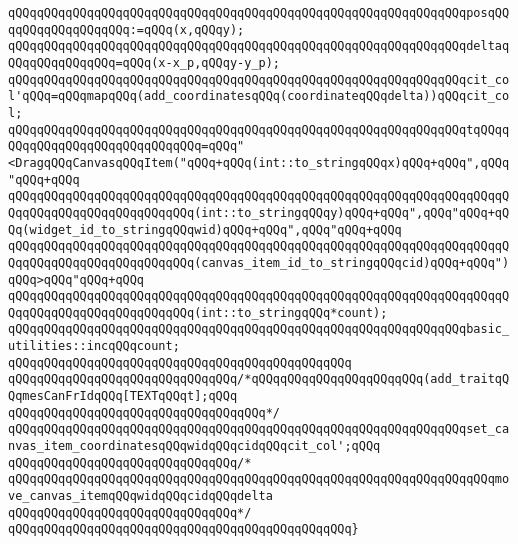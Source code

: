 \verb|qQQqqQQqqQQqqQQqqQQqqQQqqQQqqQQqqQQqqQQqqQQqqQQqqQQqqQQqqQQqqQQqposqQQqqQQqqQQqqQQqqQQq:=qQQq(x,qQQqy);|\newline
\verb|qQQqqQQqqQQqqQQqqQQqqQQqqQQqqQQqqQQqqQQqqQQqqQQqqQQqqQQqqQQqqQQqdeltaqQQqqQQqqQQqqQQq=qQQq(x-x_p,qQQqy-y_p);|\newline
\verb|qQQqqQQqqQQqqQQqqQQqqQQqqQQqqQQqqQQqqQQqqQQqqQQqqQQqqQQqqQQqqQQqcit_col'qQQq=qQQqmapqQQq(add_coordinatesqQQq(coordinateqQQqdelta))qQQqcit_col;|\newline
\verb|qQQqqQQqqQQqqQQqqQQqqQQqqQQqqQQqqQQqqQQqqQQqqQQqqQQqqQQqqQQqqQQqtqQQqqQQqqQQqqQQqqQQqqQQqqQQqqQQq=qQQq"<DragqQQqCanvasqQQqItem("qQQq+qQQq(int::to_stringqQQqx)qQQq+qQQq",qQQq"qQQq+qQQq|\newline
\verb|qQQqqQQqqQQqqQQqqQQqqQQqqQQqqQQqqQQqqQQqqQQqqQQqqQQqqQQqqQQqqQQqqQQqqQQqqQQqqQQqqQQqqQQqqQQqqQQq(int::to_stringqQQqy)qQQq+qQQq",qQQq"qQQq+qQQq(widget_id_to_stringqQQqwid)qQQq+qQQq",qQQq"qQQq+qQQq|\newline
\verb|qQQqqQQqqQQqqQQqqQQqqQQqqQQqqQQqqQQqqQQqqQQqqQQqqQQqqQQqqQQqqQQqqQQqqQQqqQQqqQQqqQQqqQQqqQQqqQQq(canvas_item_id_to_stringqQQqcid)qQQq+qQQq")qQQq>qQQq"qQQq+qQQq|\newline
\verb|qQQqqQQqqQQqqQQqqQQqqQQqqQQqqQQqqQQqqQQqqQQqqQQqqQQqqQQqqQQqqQQqqQQqqQQqqQQqqQQqqQQqqQQqqQQqqQQq(int::to_stringqQQq*count);|\newline
\newline
\verb|qQQqqQQqqQQqqQQqqQQqqQQqqQQqqQQqqQQqqQQqqQQqqQQqqQQqqQQqqQQqqQQqbasic_utilities::incqQQqcount;|\newline
\verb|qQQqqQQqqQQqqQQqqQQqqQQqqQQqqQQqqQQqqQQqqQQqqQQq|\newline
\verb|qQQqqQQqqQQqqQQqqQQqqQQqqQQqqQQq/*qQQqqQQqqQQqqQQqqQQqqQQq(add_traitqQQqmesCanFrIdqQQq[TEXTqQQqt];qQQq|\newline
\verb|qQQqqQQqqQQqqQQqqQQqqQQqqQQqqQQqqQQq*/|\newline
\verb|qQQqqQQqqQQqqQQqqQQqqQQqqQQqqQQqqQQqqQQqqQQqqQQqqQQqqQQqqQQqqQQqset_canvas_item_coordinatesqQQqwidqQQqcidqQQqcit_col';qQQq|\newline
\verb|qQQqqQQqqQQqqQQqqQQqqQQqqQQqqQQq/*|\newline
\verb|qQQqqQQqqQQqqQQqqQQqqQQqqQQqqQQqqQQqqQQqqQQqqQQqqQQqqQQqqQQqqQQqqQQqmove_canvas_itemqQQqwidqQQqcidqQQqdelta|\newline
\verb|qQQqqQQqqQQqqQQqqQQqqQQqqQQqqQQq*/|\newline
\verb|qQQqqQQqqQQqqQQqqQQqqQQqqQQqqQQqqQQqqQQqqQQqqQQq}|\newline
\newline
